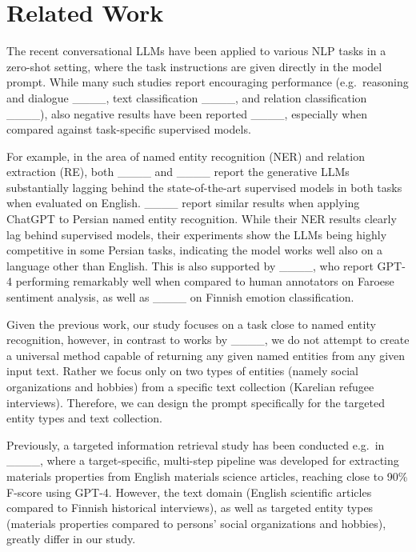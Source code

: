 \section{Related Work}
The recent conversational LLMs have been applied to various NLP tasks in a zero-shot setting, where the task instructions are given directly in the model prompt. While many such studies report encouraging performance (e.g.\ reasoning and dialogue ____, text classification ____, and relation classification ____), also negative results have been reported ____, especially when compared against task-specific supervised models.

For example, in the area of named entity recognition (NER) and relation extraction (RE), both ____ and ____ report the generative LLMs substantially lagging behind the state-of-the-art supervised models in both tasks when evaluated on English. ____ report similar results when applying ChatGPT to Persian named entity recognition. While their NER results clearly lag behind supervised models, their experiments show the LLMs being highly competitive in some Persian tasks, indicating the model works well also on a language other than English. This is also supported by ____, who report GPT-4 performing remarkably well when compared to human annotators on Faroese sentiment analysis, as well as ____ on Finnish emotion classification.

Given the previous work, our study focuses on a task close to named entity recognition, however, in contrast to works by ____, we do not attempt to create a universal method capable of returning any given named entities from any given input text. Rather we focus only on two types of entities (namely social organizations and hobbies) from a specific text collection (Karelian refugee interviews). Therefore, we can design the prompt specifically for the targeted entity types and text collection.

Previously, a targeted information retrieval study has been conducted e.g.\ in ____, where a target-specific, multi-step pipeline was developed for extracting materials properties from English materials science articles, reaching close to 90\% F-score using GPT-4. However, the text domain (English scientific articles compared to Finnish historical interviews), as well as targeted entity types (materials properties compared to persons' social organizations and hobbies), greatly differ in our study.